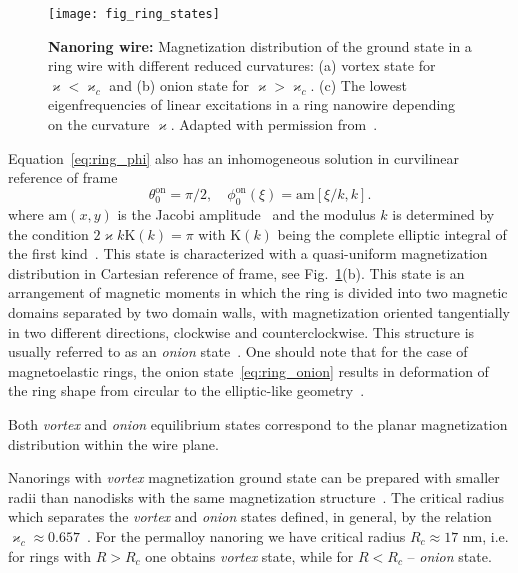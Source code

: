 \begin{figure}[t]
	\centering
	\texttt{[image: fig\_ring\_states]}
	\caption{\label{fig:ring_states}%
		\textbf{Nanoring wire:} Magnetization distribution of the ground state in a ring wire with different reduced curvatures: (a) vortex state for $\varkappa<\varkappa_c$ and (b) onion state for $\varkappa>\varkappa_c$. (c) The lowest eigenfrequencies of linear excitations in a ring nanowire depending on the curvature $\varkappa$. Adapted with permission from~\cite{Sheka15}.}
\end{figure}

Equation~\eqref{eq:ring_phi} also has an inhomogeneous solution in curvilinear reference of frame
\begin{equation}\label{eq:ring_onion}
\theta_0^\text{on}=\pi/2,\quad \phi_0^\text{on}(\xi)=\text{am}\left[\xi/k,k\right].
\end{equation}
where $\text{am}\left(x,y\right)$ is the Jacobi amplitude~\cite{NIST10} and the modulus $k$ is determined by the condition $2\varkappa k \mathrm{K}(k)=\pi$ with $\mathrm{K}(k)$ being the complete elliptic integral of the first kind~\cite{NIST10}. This state is characterized with a quasi-uniform magnetization distribution in Cartesian reference of frame, see Fig.~\ref{fig:ring_states}(b). This state is an arrangement of magnetic moments in which the ring is divided into two magnetic domains separated by two domain walls, with magnetization oriented tangentially in two different directions, clockwise and counterclockwise. This structure is usually referred to as an \textit{onion} state~\cite{Klaui03a}.  One should note that for the case of magnetoelastic rings, the onion state~\eqref{eq:ring_onion} results in deformation of the ring shape from circular to the elliptic-like geometry~\cite{Gaididei19}.

Both \textit{vortex} and \textit{onion} equilibrium states correspond to the planar magnetization distribution within the wire plane.

Nanorings with \textit{vortex} magnetization ground state can be prepared with smaller radii than nanodisks with the same magnetization structure~\cite{Kravchuk07}. The critical radius which separates the \textit{vortex} and \textit{onion} states defined, in general, by the relation $\varkappa_c \approx 0.657$~\cite{Sheka15}. For the permalloy nanoring we have  critical radius $R_{c}\approx 17$ nm, i.e. for rings with $R>R_c$ one obtains \textit{vortex} state, while for $R<R_c$ -- \textit{onion} state.

